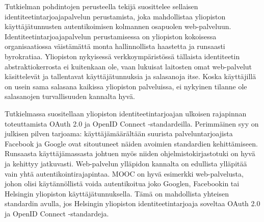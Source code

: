 \documentclass[finnish,gradu]{tktltiki}
\begin{document}
  Tutkielman pohdintojen perusteella tekijä suosittelee sellaisen identiteetintarjoajapalvelun perustamista, joka mahdollistaa yliopiston käyttäjätunnusten autentikoimisen kolmannen osapuolen web-palveluun. Identiteetintarjoajapalvelun perustamisessa on yliopiston kokoisessa organisaatiossa väistämättä monta hallinnollista haastetta ja runsaasti byrokratiaa. Yliopiston nykyisessä verkkoympäristössä tällaista identiteetin abstraktiokerrosta ei kuitenkaan ole, vaan lukuisat laitosten omat web-palvelut käsittelevät ja tallentavat käyttäjätunnuksia ja salasanoja itse. Koska käyttäjillä on usein sama salasana kaikissa yliopiston palveluissa, ei nykyinen tilanne ole salasanojen turvallisuuden kannalta hyvä.

  Tutkielmassa suositellaan yliopiston identiteetintarjoajan ulkoisen rajapinnan toteuttamista OAuth 2.0 ja OpenID Connect -standardeilla. Perimmäinen syy on julkisen pilven tarjoama: käyttäjämäärältään suurista palveluntarjoajista Facebook ja Google ovat sitoutuneet näiden avoimien standardien kehittämiseen. Runsaasta käyttäjämassasta johtuen myös niiden ohjelmistokirjastotuki on hyvä ja kehittyy jatkuvasti. Web-palvelun ylläpidon kannalta on edullista ylläpitää vain yhtä autentikointirajapintaa. MOOC on hyvä esimerkki web-palvelusta, johon olisi käytännöllistä voida autentikoitua joko Googlen, Facebookin tai Helsingin yliopiston käyttäjätunnuksella. Tämä on mahdollista yhteisen standardin avulla, jos Helsingin yliopiston identiteetintarjoaja soveltaa OAuth 2.0 ja OpenID Connect -standardeja.


\end{document}
